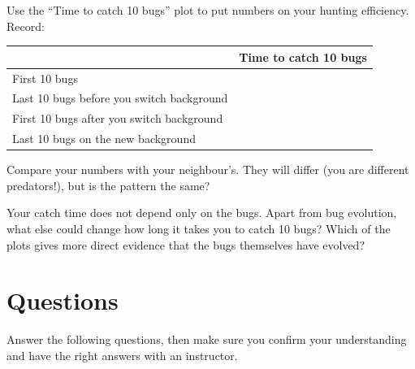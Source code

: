 \documentclass[
  a4paper]{book}
\newcounter{none} %
\begin{document}
Use the ``Time to catch 10 bugs'' plot to put numbers on your hunting efficiency. Record:

{\def\LTcaptype{none} %
\begin{longtable}[]{@{}ll@{}}
\toprule\noalign{}
& Time to catch 10 bugs \\
\midrule\noalign{}
\endhead
\bottomrule\noalign{}
\endlastfoot
First 10 bugs & \\
Last 10 bugs before you switch background & \\
First 10 bugs after you switch background & \\
Last 10 bugs on the new background & \\
\end{longtable}
}

Compare your numbers with your neighbour's. They will differ (you are different predators!), but is the pattern the same?

Your catch time does not depend only on the bugs. Apart from bug evolution, what else could change how long it takes you to catch 10 bugs? Which of the plots gives more direct evidence that the bugs themselves have evolved?

\section{Questions}\label{questions-1}

Answer the following questions, then make sure you confirm your understanding and have the right answers with an instructor.
\end{document}
